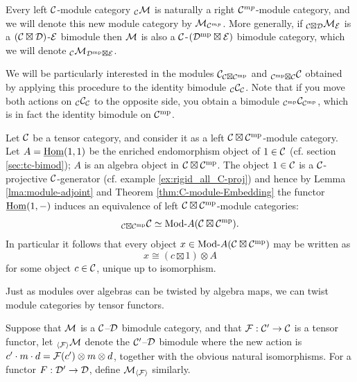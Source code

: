 \documentclass{amsart}
\begin{document}
\begin{definition}
Every left $\mathcal C$-module category ${}_\mathcal C \mathcal M$ is naturally a right $\mathcal C^{mp}$-module category, and we will denote this new module category by $\mathcal M_{\mathcal C^{mp}}$.  More generally, if ${}_{\mathcal C \boxtimes \mathcal D} \mathcal M_{\mathcal E}$ is a $(\mathcal C \boxtimes \mathcal D)$-$\mathcal E$ bimodule then $\mathcal M$ is also a $\mathcal C$-$(\mathcal D^{\mathrm{mp}} \boxtimes \mathcal E)$ bimodule category, which we will denote ${}_{\mathcal C}\mathcal M_{\mathcal D^{\mathrm{mp}} \boxtimes \mathcal E}$.
\end{definition}

We will be particularly interested in the modules $\mathcal C_{\mathcal C \boxtimes \mathcal C^{\mathrm{mp}}}$ and ${}_{\mathcal C^{\mathrm{mp}} \boxtimes \mathcal C} \mathcal C$ obtained by applying this procedure to the identity bimodule ${}_\mathcal C \mathcal C_\mathcal C$.  Note that if you move both actions on ${}_\mathcal C \mathcal C_\mathcal C$ to the opposite side, you obtain a bimodule ${}_{\mathcal C^{\mathrm{mp}}}\mathcal C_{\mathcal C^{\mathrm{mp}}}$, which is in fact the identity bimodule on $\mathcal C^{\mathrm{mp}}$.

\begin{example} \label{Ex:Hopf_bimod}
	Let $\mathcal C$ be a tensor category, and consider it as a left $\mathcal C \boxtimes \mathcal C^{\mathrm{mp}}$-module category. Let $A = \operatorname{\underline{Hom}}(1,1)$ be the enriched endomorphism object of $1 \in \mathcal C$ (cf. section \ref{sec:tc-bimod}); $A$ is an algebra object in $\mathcal C \boxtimes \mathcal C^{\mathrm{mp}}$. 
The object $1 \in \mathcal C$ is a $\mathcal C$-projective $\mathcal C$-generator (cf. example \ref{ex:rigid_all_C-proj}) and hence by Lemma \ref{lma:module-adjoint} and Theorem \ref{thm:C-module-Embedding} the functor $\operatorname{\underline{Hom}}(1, -)$ induces an 
 equivalence of left $\mathcal C \boxtimes \mathcal C^{\mathrm{mp}}$-module categories:
	\begin{equation*}
		{}_{\cC \boxtimes \cC^\mp} \cC \simeq \Mod{}{A}(\cC \boxtimes \cC^\mp).
	\end{equation*} 
In particular it follows that every object $x \in \Mod{}{A}(\cC \boxtimes \cC^\mp)$ may be written as 
\begin{equation*}
	x \cong (c \boxtimes 1) \otimes A
\end{equation*}
for some object $c \in \mathcal C$, unique up to isomorphism. 
\end{example}

Just as modules over algebras can be twisted by algebra maps, we can twist module categories by tensor functors.

\begin{definition}
Suppose that $\mathcal M$ is a $\mathcal C$--$\mathcal D$ bimodule category, and that $\mathcal F: \mathcal C' \rightarrow \mathcal C$ is a tensor functor, let
${}_{\langle \mathcal F \rangle} \mathcal M$ denote the $\mathcal C'$--$\mathcal D$ bimodule where the new action is $c' \cdot m \cdot d = \mathcal F(c') \otimes m \otimes d$, together with the obvious natural isomorphisms.  For a functor $F: \mathcal D' \rightarrow \mathcal D$, define $\mathcal M_{\langle \mathcal F \rangle}$ similarly.
\end{definition}
\end{document}
